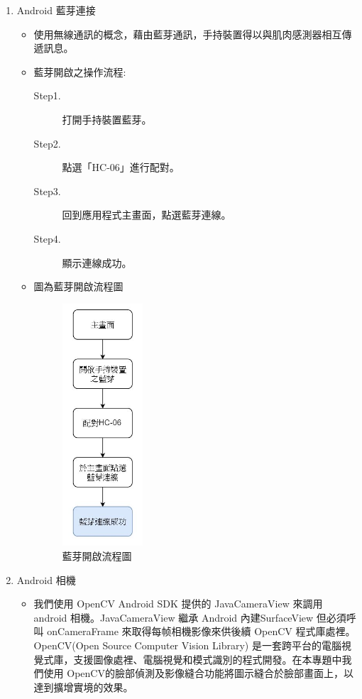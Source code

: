 \documentclass[12pt]{article}  %
\theoremstyle{plain}
\begin{document}
\begin{enumerate}
\item Android 藍芽連接
\begin{itemize}
\item 使用無線通訊的概念，藉由藍芽通訊，手持裝置得以與肌肉感測器相互傳遞訊息。
\item 藍芽開啟之操作流程:
\begin{description}
\item [Step1.] 打開手持裝置藍芽。
\item [Step2.] 點選「HC-06」進行配對。
\item [Step3.] 回到應用程式主畫面，點選藍芽連線。
\item [Step4.] 顯示連線成功。
\end{description}
\item 圖為藍芽開啟流程圖
\begin{figure}[h]  %
\centering
\includegraphics[width=3cm]{pic/ch2/藍芽開啟流程圖.JPG}
\caption{藍芽開啟流程圖}
\end{figure}
\end{itemize}

\item Android 相機
\begin{itemize}
\item 我們使用 OpenCV Android SDK 提供的 JavaCameraView 來調用 android 相機。JavaCameraView 繼承 Android 內建SurfaceView 但必須呼叫 onCameraFrame 來取得每帧相機影像來供後續 OpenCV 程式庫處裡。OpenCV(Open Source Computer Vision Library) 是一套跨平台的電腦視覺式庫，支援圖像處裡、電腦視覺和模式識別的程式開發。在本專題中我們使用 OpenCV的臉部偵測及影像縫合功能將圖示縫合於臉部畫面上，以達到擴增實境的效果。
\end{itemize}
\end{enumerate}
\end{document}

